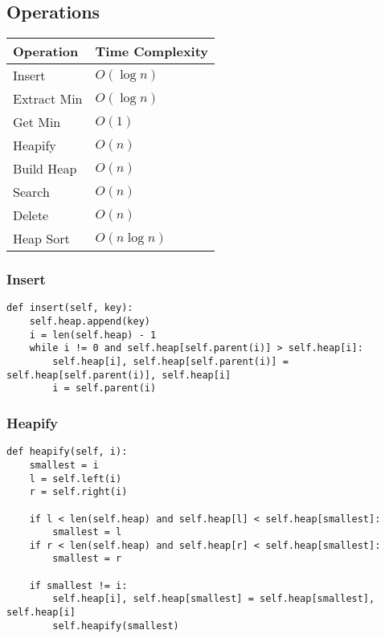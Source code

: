\subsection{Operations}
\begin{summary}
    \begin{center}
        \begin{tabular}{ll}
            \toprule
            \textbf{Operation} & \textbf{Time Complexity} \\
            \midrule
            Insert & $O(\log n)$ \\
            \midrule
            Extract Min & $O(\log n)$ \\
            \midrule
            Get Min & $O(1)$ \\
            \midrule
            Heapify & $O(n)$ \\
            \midrule
            Build Heap & $O(n)$ \\
            \midrule
            Search & $O(n)$ \\
            \midrule
            Delete & $O(n)$ \\
            \midrule
            Heap Sort & $O(n \log n)$ \\
        \end{tabular}
    \end{center}
\end{summary}

\subsubsection{Insert}
\begin{algo}
\begin{lstlisting}
def insert(self, key):
    self.heap.append(key)
    i = len(self.heap) - 1
    while i != 0 and self.heap[self.parent(i)] > self.heap[i]:
        self.heap[i], self.heap[self.parent(i)] = self.heap[self.parent(i)], self.heap[i]
        i = self.parent(i)
\end{lstlisting}
\end{algo}

\subsubsection{Heapify}
\begin{algo}
\begin{lstlisting}
def heapify(self, i):
    smallest = i
    l = self.left(i)
    r = self.right(i)

    if l < len(self.heap) and self.heap[l] < self.heap[smallest]:
        smallest = l
    if r < len(self.heap) and self.heap[r] < self.heap[smallest]:
        smallest = r

    if smallest != i:
        self.heap[i], self.heap[smallest] = self.heap[smallest], self.heap[i]
        self.heapify(smallest)
\end{lstlisting}
\end{algo}

